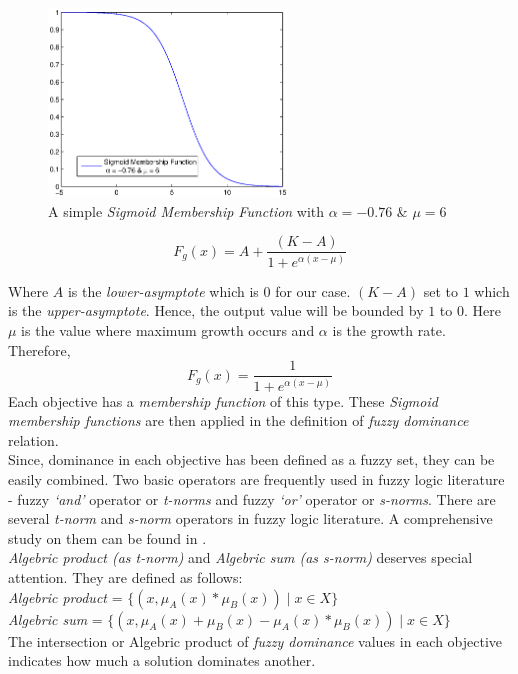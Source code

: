 \documentclass[journal]{IEEEtran}
\begin{document}

\begin{figure}[!t]
\centering
\includegraphics[width=2.5in]{figs/sigmoid.eps}

\caption{A simple \textit{Sigmoid Membership Function} with $\alpha = -0.76$ \& $\mu = 6$ }
\label{sigmoid}
\end{figure}


\begin{equation}\label{eqn:sigmoidEqn} 
F_g(x)=A +\frac{(K-A)}{1+e^{\alpha(x-\mu)}}
\end{equation}

Where $A$ is the \textit{lower-asymptote} which is $0$ for our case. $(K-A)$ set to $1$ which is the  \textit{upper-asymptote}. Hence, the output value will be bounded by $1$ to $0$.
Here $\mu$ is the value where maximum growth occurs and $\alpha$ is the growth rate. Therefore,
\begin{equation}F_g(x)=\frac{1}{1+e^{\alpha(x-\mu)}}\end{equation}
Each objective has a \textit{membership function} of this type. These \textit{Sigmoid membership functions} are then applied in the definition of \textit{fuzzy dominance} relation.\\
Since, dominance in each objective has been defined as a fuzzy set, they can be easily combined. Two basic operators are frequently used in fuzzy logic literature - fuzzy \textit{`and'} operator or \textit{t-norms} and fuzzy \textit{`or'} operator or \textit{s-norms}. There are several \textit{t-norm} and \textit{s-norm} operators in fuzzy logic literature. A comprehensive study on them can be found in \cite{zimmermann1992fuzzy}.\\
\textit{Algebric product (as t-norm)} and \textit{Algebric sum (as s-norm)} deserves special attention. They are defined as follows:\\
\textit{Algebric product} = \begin{math}\{(x,\mu_A(x)*\mu_B(x))\mid x\in X\}\end{math}\\
\textit{Algebric sum} = \begin{math}\{(x,\mu_A(x)+\mu_B(x)-\mu_A(x)*\mu_B(x))\mid x\in X\}\end{math}\\
The intersection or Algebric product of \textit{fuzzy dominance} values in each objective indicates how much a solution dominates another.
\end{document}
